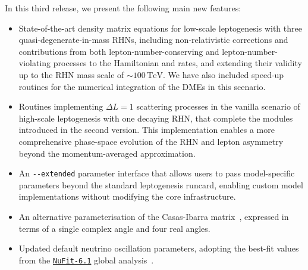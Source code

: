 \documentclass[12pt, a4paper]{article}
\begin{document}
In this third release, we present the following main new features:
%
\begin{itemize}
 \item State-of-the-art density matrix equations for low-scale leptogenesis with three quasi-degenerate-in-mass
 RHNs, including non-relativistic corrections and contributions
 from both lepton-number-conserving and lepton-number-violating processes to the
 Hamiltonian and rates, and extending their validity up to the RHN mass scale of $\sim 100 \,\text{TeV}$. We have also included speed-up routines for the numerical integration of the DMEs in this scenario.

 \item Routines implementing $\Delta L = 1$ scattering processes  in the vanilla scenario of high-scale leptogenesis with one decaying RHN, that complete the modules introduced in the second version. This implementation enables a more comprehensive phase-space evolution of the RHN and lepton asymmetry beyond the momentum-averaged approximation.
 
 \item An \texttt{-{}-extended} parameter interface that allows users to pass model-specific
 parameters beyond the standard leptogenesis runcard, enabling custom model implementations
 without modifying the core infrastructure.

 \item An alternative parameterisation of the Casas-Ibarra matrix~\cite{Drewes:2021nqr},
 expressed in terms of a single complex angle and four real angles.


 \item Updated default neutrino oscillation parameters, adopting the best-fit values
 from the \href{http://www.nu-fit.org/?q=node/309}{\texttt{NuFit-6.1}} global analysis~\cite{Esteban:2024eli}. 
\end{itemize}
%
\end{document}
